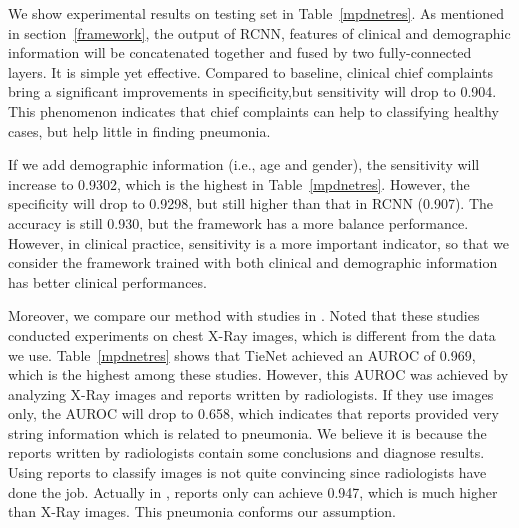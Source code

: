 \documentclass[journal]{IEEEtran}
\begin{document}
We show experimental results on testing set in Table~\ref{mpdnetres}. As mentioned in section~\ref{framework}, the output of RCNN, features of clinical and demographic information will be concatenated together and fused by two fully-connected layers. It is simple yet effective. Compared to baseline, clinical chief complaints bring a significant improvements in specificity,but sensitivity will drop to 0.904. This phenomenon indicates that chief complaints can help to classifying healthy cases, but help little in finding pneumonia.

If we add demographic information (i.e., age and gender), the sensitivity will increase to 0.9302, which is the highest in Table~\ref{mpdnetres}. However, the specificity will drop to 0.9298, but still higher than that in RCNN (0.907). 
The accuracy is still 0.930, but the framework has a more balance performance. 
However, in clinical practice, sensitivity is a more important indicator, so that we consider the framework trained with both clinical and demographic information has better clinical performances. 

Moreover, we compare our method with studies in \cite{Wang2017ChestX,yao2017learning, Rajpurkar2017CheXNet, Wang2018TieNet}. Noted that these studies conducted experiments on chest X-Ray images, which is different from the data we use. Table~\ref{mpdnetres} shows that TieNet \cite{Wang2018TieNet} achieved an AUROC of 0.969, which is the highest among these studies. However, this AUROC was achieved by analyzing X-Ray images and reports written by radiologists. If they use images only, the AUROC will drop to 0.658, which indicates that reports provided very string information which is related to pneumonia. We believe it is because the reports written by radiologists contain some conclusions and diagnose results. Using reports to classify images is not quite convincing since radiologists have done the job. Actually in \cite{Wang2018TieNet}, reports only can achieve 0.947, which is much higher than X-Ray images. This pneumonia conforms our assumption.
\end{document}
